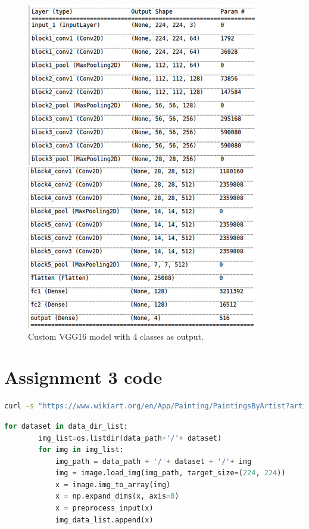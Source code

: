 
\begin{figure}[H]
    \centering
    \includegraphics[scale=0.7]{Graphics/Assignment3/custom_model_image.png}
    \caption{Custom VGG16 model with 4 classes as output.}
    \label{fig:custom_vgg16}
\end{figure}

\section{Assignment 3 code}

\begin{lstlisting}[frame=single, language=Bash, label={code:fetch_images}, caption={Code to fetch images from Wikiart for specific artists, in this case Manet.}]
    curl -s "https://www.wikiart.org/en/App/Painting/PaintingsByArtist?artistUrl=edouard-manet&json=2" | jq -r 'map(.image) | join("\n")' | sed '' | xargs -P 10 -n 1 curl -s -O
\end{lstlisting}

\begin{lstlisting}[frame=single, language=Python, label={code:load_data}, caption={Code to load data for preprocessing.}]
    for dataset in data_dir_list:
	    img_list=os.listdir(data_path+'/'+ dataset)
    	for img in img_list:
    		img_path = data_path + '/'+ dataset + '/'+ img 
    		img = image.load_img(img_path, target_size=(224, 224))
    		x = image.img_to_array(img)
    		x = np.expand_dims(x, axis=0)
    		x = preprocess_input(x)
    		img_data_list.append(x)
\end{lstlisting}


